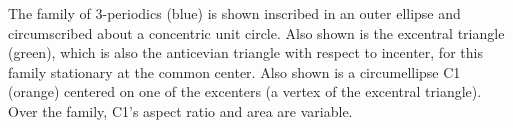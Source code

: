 The family of 3-periodics (blue) is shown inscribed in an outer ellipse and circumscribed about a concentric unit circle. Also shown is the excentral triangle (green), which is also the anticevian triangle with respect to incenter, for this family stationary at the common center. Also shown is a circumellipse C1 (orange) centered on one of the excenters (a vertex of the excentral triangle). Over the family, C1's aspect ratio and area are variable.